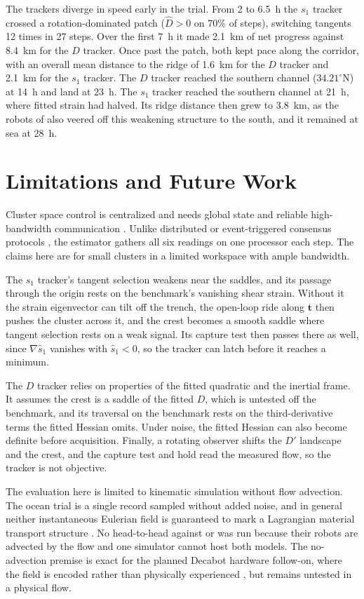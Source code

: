 \documentclass[lettersize,journal]{IEEEtran}
\begin{document}
The trackers diverge in speed early in the trial. From 2 to 6.5~h the
$s_1$ tracker crossed a rotation-dominated patch ($\hat{D} > 0$ on 70\% of
steps), switching tangents 12 times in 27 steps. Over the first 7~h it
made 2.1~km of net progress against 8.4~km for the $D$ tracker. Once past
the patch, both kept pace along the corridor, with an overall mean distance
to the ridge of 1.6~km for the $D$ tracker and 2.1~km for the $s_1$
tracker. The $D$ tracker reached the southern channel
($34.21^{\circ}\mathrm{N}$) at 14~h and land at 23~h. The $s_1$ tracker
reached the southern channel at 21~h, where fitted strain had halved. Its
ridge distance then grew to 3.8~km, as the robots of \cite{26} also veered
off this weakening structure to the south, and it remained at sea at
28~h.

\section{Limitations and Future Work}
\label{sec:disc_limits}

Cluster space control is centralized and needs global state and reliable
high-bandwidth communication \cite{30}. Unlike distributed or
event-triggered consensus protocols \cite{35}, the estimator gathers all six
readings on one processor each step. The claims here are for small clusters
in a limited workspace with ample bandwidth.

The $s_1$ tracker's tangent selection weakens near the saddles, and its
passage through the origin rests on the benchmark's vanishing shear
strain. Without it the strain eigenvector
can tilt off the trench, the open-loop ride along $\mathbf{t}$ then
pushes the cluster across it, and the crest becomes a smooth saddle where
tangent selection rests on a weak signal. Its capture test then passes
there as well, since $\nabla\hat{s}_1$ vanishes with $\hat{s}_1 < 0$, so
the tracker can latch before it reaches a minimum.

The $D$ tracker relies on properties of the fitted quadratic and the
inertial frame. It assumes the crest is a saddle of the fitted $D$, which
is untested off the benchmark, and its traversal on the benchmark rests on
the third-derivative terms the fitted Hessian omits. Under noise, the
fitted Hessian can also become definite before acquisition. Finally, a
rotating observer shifts the $D'$ landscape and the crest, and the capture
test and hold read the measured flow, so the tracker is not objective.

The evaluation here is limited to kinematic simulation without flow
advection. The ocean trial is a single record sampled without added noise,
and in general neither instantaneous Eulerian field is guaranteed to mark a
Lagrangian material transport structure \cite{18}. No head-to-head against
\cite{26,27,28} or \cite{29} was run because their robots are advected by
the flow and one simulator cannot host both models. The no-advection
premise is exact for the planned Decabot hardware follow-on, where the
field is encoded rather than physically experienced \cite{32}, but remains
untested in a physical flow.
\end{document}
